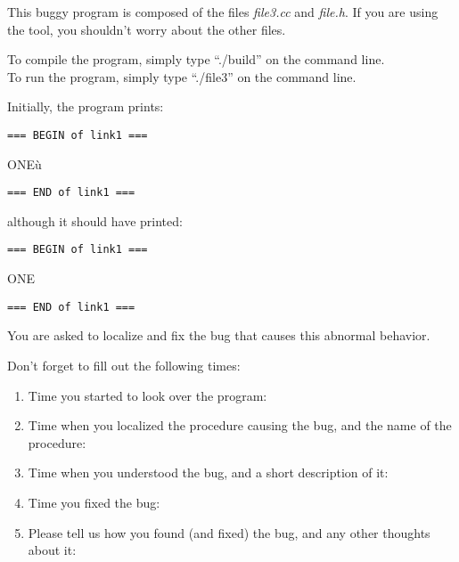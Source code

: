 \documentclass{article}
\title{}
\author{Debugging experiment - Bug 3}
\date{July 30, 2003}
\begin{document}
\maketitle
\begin{flushleft}
\vspace{0.5in}

\thispagestyle{empty}

This buggy program is composed of the files {\it file3.cc} and 
{\it file.h}. If you are using the tool, you shouldn't worry about the 
other files.

\vspace{0.1in}
To compile the program, simply type ``./build'' on the command line.\\
To run the program, simply type ``./file3'' on the command line.


\vspace{0.1in}
Initially, the program prints:

\begin{verbatim}
=== BEGIN of link1 ===
\end{verbatim}
ONE\`{u}
\begin{verbatim}
=== END of link1 ===
\end{verbatim}

although it should have printed:
\begin{verbatim}
=== BEGIN of link1 ===
\end{verbatim}
ONE
\begin{verbatim}
=== END of link1 ===
\end{verbatim}


You are asked to localize and fix the bug that causes this abnormal behavior.


\vspace{0.3in}
Don't forget to fill out the following times:
\begin{enumerate}
\item{Time you started to look over the program:}
\item{Time when you localized the procedure causing the bug, and the name
      of the procedure:\vspace{0.2in}}
\item{Time when you understood the bug, and a short description of it:\vspace{0.4in}}

\item{Time you fixed the bug:}

\item{Please tell us how you found (and fixed) the bug, and any other thoughts 
about it:}

\end{enumerate}

\end{flushleft}
\end{document}
